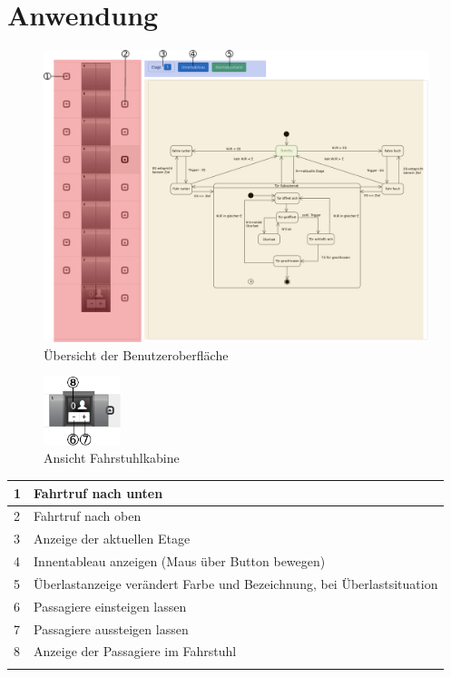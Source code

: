 \chapter{Anwendung}
\begin{figure}[h!]
	\centering
	\includegraphics[width=1.2\textwidth]{images/UI.eps}
	\caption{Übersicht der Benutzeroberfläche}
	\label{fig:ui}
\end{figure}
\begin{figure}[h!]
	\centering
	\includegraphics[width=0.2\textwidth]{images/UI_Tuer.eps}
	\caption{Ansicht Fahrstuhlkabine}
	\label{fig:ui_tuer}
\end{figure}
\begin{tabularx}{0.92\textwidth}{lX}
	1 & Fahrtruf nach unten\\ \hline
	2 & Fahrtruf nach oben\\ \hline
	3 & Anzeige der aktuellen Etage\\ \hline
	4 & Innentableau anzeigen (Maus über Button bewegen)\\ \hline
	5 & Überlastanzeige verändert Farbe und Bezeichnung, bei Überlastsituation\\ \hline
	6 & Passagiere einsteigen lassen\\ \hline
	7 & Passagiere aussteigen lassen\\ \hline
	8 & Anzeige der Passagiere im Fahrstuhl\\ \hline
\label{ui_table}
\end{tabularx}

